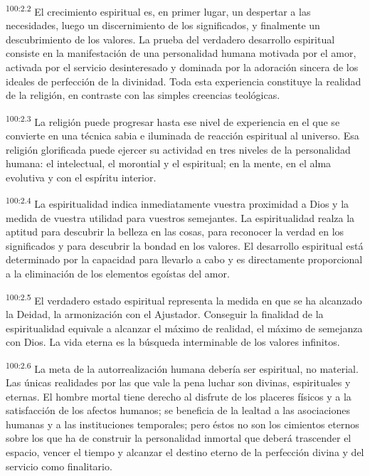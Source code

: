 \documentclass[twoside, 11pt]{book}
\begin{document}
\par
\textsuperscript{100:2.2} El crecimiento espiritual es, en primer lugar, un despertar a las necesidades, luego un discernimiento de los significados, y finalmente un descubrimiento de los valores. La prueba del verdadero desarrollo espiritual consiste en la manifestación de una personalidad humana motivada por el amor, activada por el servicio desinteresado y dominada por la adoración sincera de los ideales de perfección de la divinidad. Toda esta experiencia constituye la realidad de la religión, en contraste con las simples creencias teológicas.

\par
\textsuperscript{100:2.3} La religión puede progresar hasta ese nivel de experiencia en el que se convierte en una técnica sabia e iluminada de reacción espiritual al universo. Esa religión glorificada puede ejercer su actividad en tres niveles de la personalidad humana: el intelectual, el morontial y el espiritual; en la mente, en el alma evolutiva y con el espíritu interior.

\par
\textsuperscript{100:2.4} La espiritualidad indica inmediatamente vuestra proximidad a Dios y la medida de vuestra utilidad para vuestros semejantes. La espiritualidad realza la aptitud para descubrir la belleza en las cosas, para reconocer la verdad en los significados y para descubrir la bondad en los valores. El desarrollo espiritual está determinado por la capacidad para llevarlo a cabo y es directamente proporcional a la eliminación de los elementos egoístas del amor.

\par
\textsuperscript{100:2.5} El verdadero estado espiritual representa la medida en que se ha alcanzado la Deidad, la armonización con el Ajustador. Conseguir la finalidad de la espiritualidad equivale a alcanzar el máximo de realidad, el máximo de semejanza con Dios. La vida eterna es la búsqueda interminable de los valores infinitos.

\par
\textsuperscript{100:2.6} La meta de la autorrealización humana debería ser espiritual, no material. Las únicas realidades por las que vale la pena luchar son divinas, espirituales y eternas. El hombre mortal tiene derecho al disfrute de los placeres físicos y a la satisfacción de los afectos humanos; se beneficia de la lealtad a las asociaciones humanas y a las instituciones temporales; pero éstos no son los cimientos eternos sobre los que ha de construir la personalidad inmortal que deberá trascender el espacio, vencer el tiempo y alcanzar el destino eterno de la perfección divina y del servicio como finalitario.
\end{document}

